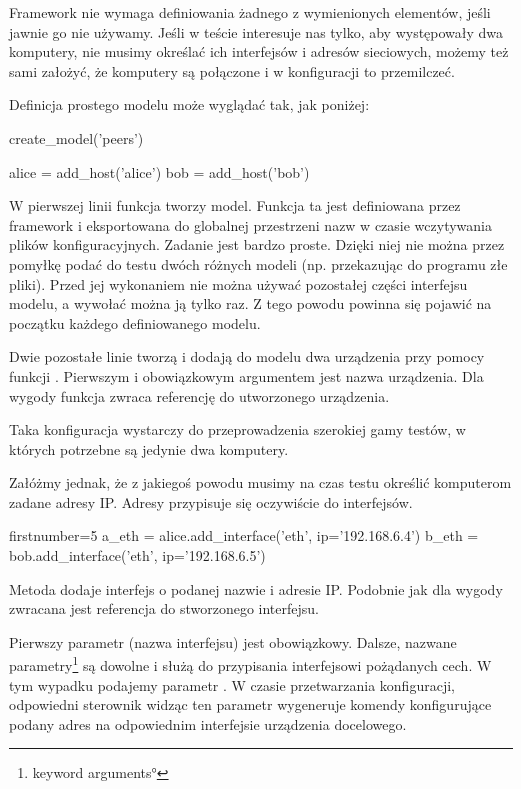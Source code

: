 \documentclass[00-praca-magisterska.tex]{subfiles}
\begin{document}
Framework nie wymaga definiowania żadnego z wymienionych elementów, jeśli
jawnie go nie używamy. Jeśli w teście interesuje nas tylko, aby występowały
dwa komputery, nie musimy określać ich interfejsów i adresów sieciowych,
możemy też sami założyć, że komputery są połączone i w konfiguracji to
przemilczeć.

Definicja prostego modelu może wyglądać tak, jak poniżej:

\begin{pythoncode}
  create_model('peers')

  alice = add_host('alice')
  bob   = add_host('bob')
\end{pythoncode}

W pierwszej linii funkcja  tworzy model. Funkcja ta jest
definiowana przez framework i eksportowana do globalnej przestrzeni nazw w
czasie wczytywania plików konfiguracyjnych. Zadanie  jest
bardzo proste. Dzięki niej nie można przez pomyłkę podać do testu dwóch
różnych modeli (np. przekazując do programu złe pliki). Przed jej wykonaniem
nie można używać pozostałej części interfejsu modelu, a wywołać można ją tylko
raz. Z tego powodu powinna się pojawić na początku każdego definiowanego
modelu.

Dwie pozostałe linie tworzą i dodają do modelu dwa urządzenia przy pomocy
funkcji . Pierwszym i obowiązkowym argumentem jest nazwa
urządzenia. Dla wygody funkcja zwraca referencję do utworzonego urządzenia.

Taka konfiguracja wystarczy do przeprowadzenia szerokiej gamy testów, w
których potrzebne są jedynie dwa komputery.

Załóżmy jednak, że z jakiegoś powodu musimy na czas testu określić komputerom
zadane adresy IP. Adresy przypisuje się oczywiście do interfejsów.

\begin{pythoncode*}{firstnumber=5}
  a_eth = alice.add_interface('eth', ip='192.168.6.4')
  b_eth = bob.add_interface('eth', ip='192.168.6.5')
\end{pythoncode*}

Metoda  dodaje interfejs o podanej nazwie i adresie IP.
Podobnie jak  dla wygody zwracana jest referencja do
stworzonego interfejsu.

Pierwszy parametr (nazwa interfejsu) jest obowiązkowy. Dalsze, nazwane
parametry\footnote{\ang{keyword arguments}} są dowolne i służą do przypisania
interfejsowi pożądanych cech.  W tym wypadku podajemy parametr . W
czasie przetwarzania konfiguracji, odpowiedni sterownik widząc ten parametr
wygeneruje komendy konfigurujące podany adres na odpowiednim interfejsie
urządzenia docelowego.
\end{document}
